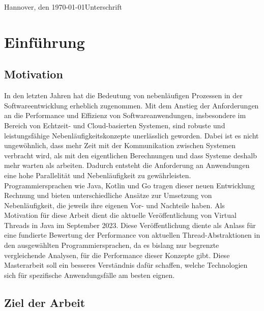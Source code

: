 \documentclass[fontsize=12pt,paper=a4,twoside=semi,parskip=half-,headsepline,headinclude]{scrreprt}
\begin{document}
Hannover, den \today \hfill Unterschrift


\newpage 
\thispagestyle{empty}
\quad 
\newpage


  \tableofcontents  %

\listoffigures      %

\listoftables       %

\chapter{Einführung}

\section{Motivation}

In den letzten Jahren hat die Bedeutung von nebenläufigen Prozessen in der Softwareentwicklung erheblich zugenommen. Mit dem Anstieg der Anforderungen an die Perfor\-mance und Effizienz von Softwareanwendungen, insbesondere im Bereich von Echtzeit- und Cloud-basierten Systemen, sind robuste und leistungsfähige Nebenläufigkeitskonzepte unerlässlich geworden. Dabei ist es nicht ungewöhnlich, dass mehr Zeit mit der Kommunikation zwischen Systemen verbracht wird, als mit den eigentlichen Berechnungen und dass Systeme deshalb mehr warten als arbeiten. Dadurch entsteht die Anforderung an Anwendungen eine hohe Parallelität und Nebenläufigkeit zu gewährleisten. Programmiersprachen wie Java, Kotlin und Go tragen dieser neuen Entwicklung Rechnung und bieten unterschiedliche Ansätze zur Umsetzung von Nebenläufigkeit, die jeweils ihre eigenen Vor- und Nachteile haben. Als Motivation für diese Arbeit dient die aktuelle Veröffentlichung von Virtual Threads in Java im September 2023. Diese Veröffentlichung diente als Anlass für eine fundierte Bewertung der Performance von aktuellen Thread-Abstraktionen in den ausgewählten Programmiersprachen, da es bislang nur begrenzte vergleichende Analysen, für die Performance dieser Konzepte gibt. Diese Masterarbeit soll ein besseres Verständnis dafür schaffen, welche Technologien sich für spezifische Anwendungsfälle am besten eignen.

\section{Ziel der Arbeit}
\end{document}
